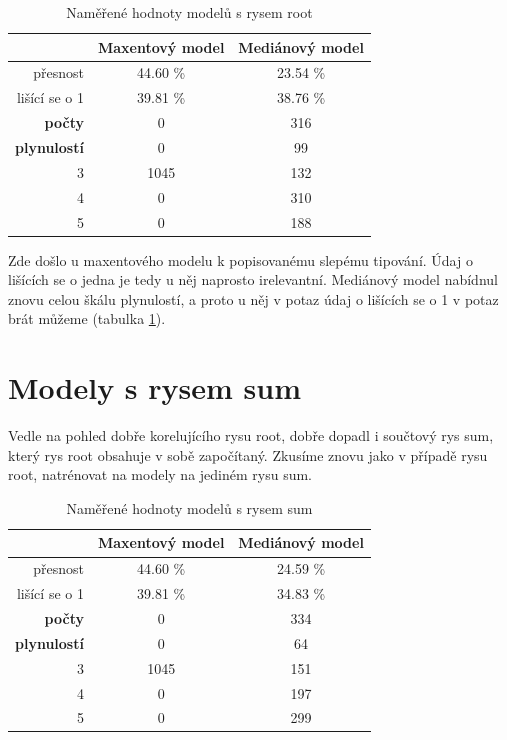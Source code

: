 \documentclass[12pt,a4paper]{report}
\begin{document}
\begin{table}[!htbp]
\begin{center}
\begin{tabular}{|r|c|c|}
\hline
 & \textbf{Maxentový model} & \textbf{Mediánový model} \\
 \hline
     přesnost & 44.60 \%  & 23.54 \%  \\
\hline
lišící se o 1 & 39.81 \% & 38.76 \%  \\
\hline
     \textbf{počty} \quad 1 & \color{red}0   & \color{OliveGreen}316   \\
\textbf{plynulostí} \quad 2 & \color{red}0 & \color{OliveGreen}99   \\
                          3 & 1045 & \color{OliveGreen}132 \\
                          4 & \color{red}0   & \color{OliveGreen}310 \\
                          5 & \color{red}0   & \color{OliveGreen}188  \\
\hline
\end{tabular}
\caption{Naměřené hodnoty modelů s rysem root}\label{tb:root}
\end{center}
\end{table}

Zde došlo u maxentového modelu k popisovanému slepému tipování. Údaj o lišících se o jedna je tedy u něj naprosto irelevantní. Mediánový model nabídnul znovu celou škálu plynulostí, a proto u něj v potaz údaj o lišících se o 1 v potaz brát můžeme (tabulka \ref{tb:root}).

\section{Modely s rysem sum}
Vedle na pohled dobře korelujícího rysu root, dobře dopadl i součtový rys sum, který rys root obsahuje v sobě započítaný. Zkusíme znovu jako v případě rysu root, natrénovat na modely na jediném rysu sum.

\begin{table}[!htbp]
\begin{center}
\begin{tabular}{|r|c|c|}
\hline
 & \textbf{Maxentový model} & \textbf{Mediánový model} \\
 \hline
     přesnost & 44.60 \%  & 24.59 \%  \\
\hline
lišící se o 1 & 39.81 \% & 34.83 \%  \\
\hline
     \textbf{počty} \quad 1 & \color{red}0   & \color{OliveGreen}334   \\
\textbf{plynulostí} \quad 2 & \color{red}0 & \color{OliveGreen}64   \\
                          3 & 1045 & \color{OliveGreen}151 \\
                          4 & \color{red}0   & \color{OliveGreen}197 \\
                          5 & \color{red}0   & \color{OliveGreen}299  \\
\hline
\end{tabular}
\caption{Naměřené hodnoty modelů s rysem sum}\label{tb:sum}
\end{center}
\end{table}
\end{document}
